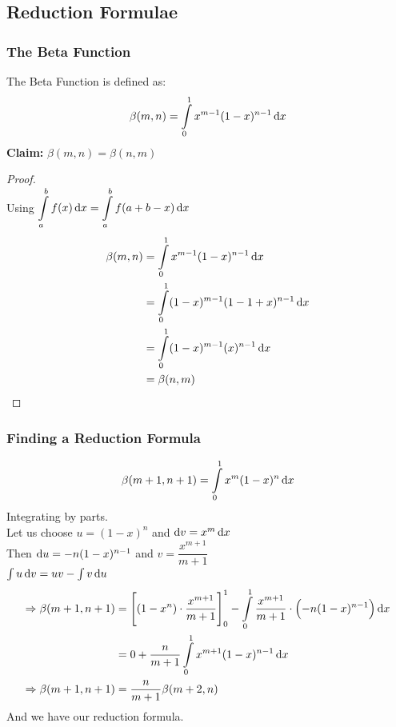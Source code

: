 \documentclass[14]{article}
\theoremstyle{definition}
\theoremstyle{case}
\begin{document}
\subsection{Reduction Formulae}
\subsubsection{The Beta Function}
The Beta Function is defined as:
\[\beta(m,n) = \int\limits_0^1 x^{m-1} (1-x)^{n-1} \dif x\]
\textbf{Claim: } $\beta(m, n) = \beta(n, m)$
\begin{proof}\text{}\\
Using $\displaystyle \int\limits_a^b f(x) \dif x = \int\limits_a^b f(a+b-x) \dif x$
\begin{align*}
\beta(m, n) &= \int\limits_0^1 x^{m-1} (1-x)^{n-1} \dif x\\
&= \int\limits_0^1 (1-x)^{m-1} (1-1+x)^{n-1} \dif x\\
&= \int\limits_0^1 (1-x)^{m-1} (x)^{n-1} \dif x\\
&= \beta(n, m)
\end{align*}
\end{proof}
\subsubsection*{Finding a Reduction Formula}
\[\beta(m+1, n+1) = \int\limits_0^1 x^m (1-x)^n \dif x\]
Integrating by parts. \\
Let us choose $u = (1-x)^n$ and $\dif v = x^m \dif x$\\
Then $\dif u = -n(1-x)^{n-1}$ and $v = \dfrac{x^{m+1}}{m+1}$\\
$\int u \dif v = uv - \int v \dif u$
\begin{align*}
\Rightarrow \beta(m+1, n+1) &= \left[(1-x^n)\cdot \dfrac{x^{m+1}}{m+1} \right]_0^1 - \int\limits_0^1 \dfrac{x^{m+1}}{m+1} \cdot \left(-n(1-x)^{n-1} \right)\dif x\\
&= 0 + \dfrac{n}{m+1}\int\limits_0^1 x^{m+1}(1-x)^{n-1} \dif x\\
\Rightarrow \beta(m+1, n+1) &= \dfrac{n}{m+1} \beta(m+2, n)
\end{align*}
And we have our reduction formula.
\pagebreak
\end{document}
